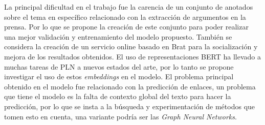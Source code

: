 \begin{recomendations}

    La principal dificultad en el trabajo fue la carencia de un conjunto de anotados
    sobre el tema en específico relacionado con la extracción de argumentos en la prensa.
    Por lo que se propone la creación de este conjunto para poder realizar una mejor 
    validación y entrenamiento del modelo propuesto. También se considera la creación de un servicio 
    online basado en Brat para la socialización y mejora de los resultados obtenidos.
    El uso de representaciones BERT ha llevado a muchas tareas de PLN a nuevos estados 
    del arte, por lo tanto se propone investigar el uso de estos \emph{embeddings} en 
    el modelo. El problema principal obtenido en el modelo fue relacionado con la 
    predicción de enlaces, un problema que tiene el modelo es la falta de contexto global
    del texto para hacer la predicción, por lo que se insta a la búsqueda y experimentación
    de métodos que tomen esto en cuenta, una variante podría ser las \emph{Graph Neural Networks}.

\end{recomendations}
